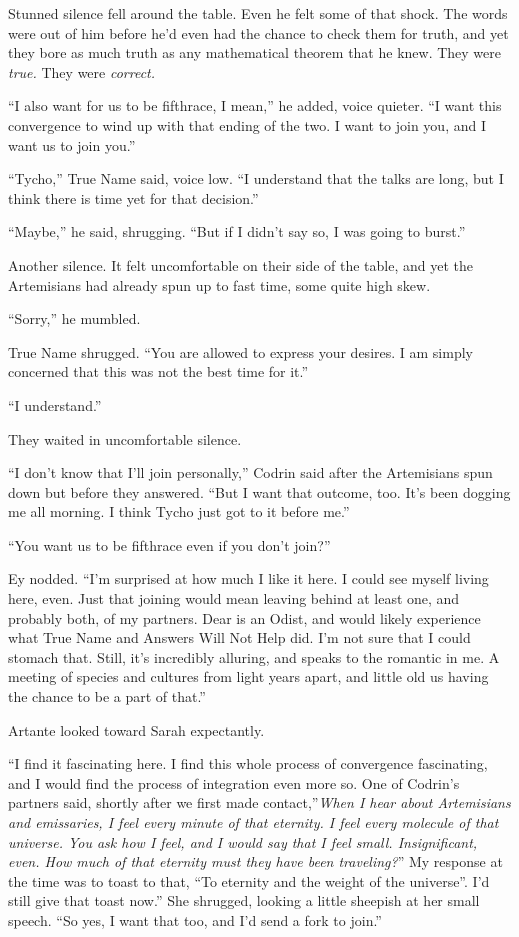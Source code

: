 Stunned silence fell around the table. Even he felt some of that shock. The words were out of him before he'd even had the chance to check them for truth, and yet they bore as much truth as any mathematical theorem that he knew. They were \emph{true.} They were \emph{correct.}

``I also want for us to be fifthrace, I mean,'' he added, voice quieter. ``I want this convergence to wind up with that ending of the two. I want to join you, and I want us to join you.''

``Tycho,'' True Name said, voice low. ``I understand that the talks are long, but I think there is time yet for that decision.''

``Maybe,'' he said, shrugging. ``But if I didn't say so, I was going to burst.''

Another silence. It felt uncomfortable on their side of the table, and yet the Artemisians had already spun up to fast time, some quite high skew.

``Sorry,'' he mumbled.

True Name shrugged. ``You are allowed to express your desires. I am simply concerned that this was not the best time for it.''

``I understand.''

They waited in uncomfortable silence.

``I don't know that I'll join personally,'' Codrin said after the Artemisians spun down but before they answered. ``But I want that outcome, too. It's been dogging me all morning. I think Tycho just got to it before me.''

``You want us to be fifthrace even if you don't join?''

Ey nodded. ``I'm surprised at how much I like it here. I could see myself living here, even. Just that joining would mean leaving behind at least one, and probably both, of my partners. Dear is an Odist, and would likely experience what True Name and Answers Will Not Help did. I'm not sure that I could stomach that. Still, it's incredibly alluring, and speaks to the romantic in me. A meeting of species and cultures from light years apart, and little old us having the chance to be a part of that.''

Artante looked toward Sarah expectantly.

``I find it fascinating here. I find this whole process of convergence fascinating, and I would find the process of integration even more so. One of Codrin's partners said, shortly after we first made contact,''\emph{When I hear about Artemisians and emissaries, I feel every minute of that eternity. I feel every molecule of that universe. You ask how I feel, and I would say that I feel small. Insignificant, even. How much of that eternity must they have been traveling?}'' My response at the time was to toast to that, ``To eternity and the weight of the universe''. I'd still give that toast now.'' She shrugged, looking a little sheepish at her small speech. ``So yes, I want that too, and I'd send a fork to join.''

